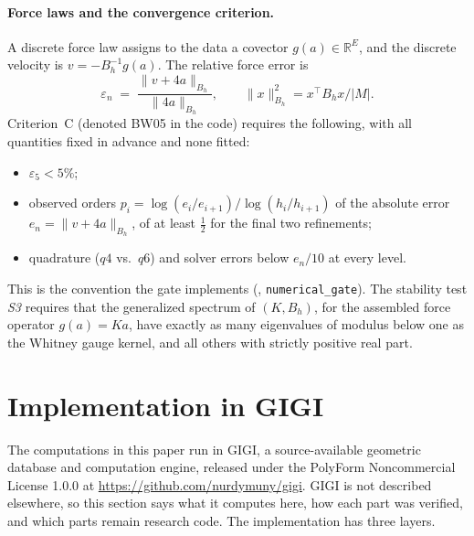 \documentclass[11pt]{article}
\theoremstyle{definition}
\theoremstyle{remark}
\newcommand{\GIGI}{\textsc{GIGI}}
\newcommand{\BW}{Criterion~C}
\newcommand{\RR}{\mathbb{R}}
\newcommand{\norm}[1]{\lVert #1\rVert}
\begin{document}
\paragraph{Force laws and the convergence criterion.}
A discrete force law assigns to the data a covector $g(a)\in\RR^E$, and the discrete
velocity is $v=-B_h^{-1}g(a)$. The relative force error is
\begin{equation}
  \varepsilon_n \;=\; \frac{\norm{v+4a}_{B_h}}{\norm{4a}_{B_h}},\qquad \norm{x}_{B_h}^2=x^\top B_hx/|M|.
\end{equation}
\BW{} (denoted BW05 in the code) requires the following, with all quantities fixed in advance and none fitted:
\begin{itemize}
  \item $\varepsilon_5<5\%$;
  \item observed orders $p_i=\log(e_i/e_{i+1})/\log(h_i/h_{i+1})$ of the absolute error
    $e_n=\norm{v+4a}_{B_h}$, of at least $\tfrac12$ for the final two refinements;
  \item quadrature ($q4$ vs.\ $q6$) and solver errors below $e_n/10$ at every level.
\end{itemize}
This is the convention the gate implements (,
\texttt{numerical\_gate}).
The stability test \emph{S3} requires that the generalized spectrum of $(K,B_h)$, for
the assembled force operator $g(a)=Ka$, have exactly as many eigenvalues of modulus
below one as the Whitney gauge kernel, and all others with strictly positive real part.

\section{Implementation in GIGI}\label{sec:gigi}

The computations in this paper run in \GIGI{}, a source-available geometric database and
computation engine, released under the PolyForm Noncommercial License 1.0.0 at
\url{https://github.com/nurdymuny/gigi}. \GIGI{} is not described elsewhere, so this section
says what it computes here, how each part was verified, and which parts remain research code.
The implementation has three layers.
\end{document}
